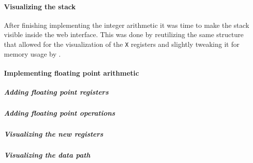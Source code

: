 \paragraph*{Visualizing the stack}

After finishing implementing the integer arithmetic it was time to make the stack visible inside the web interface. This was done by reutilizing the same structure that allowed for the visualization of the \verb|X| registers and slightly tweaking it for memory usage by .

\paragraph*{Implementing floating point arithmetic}
\subparagraph*{Adding floating point registers}
\subparagraph*{Adding floating point operations}
\subparagraph*{Visualizing the new registers}
\subparagraph*{Visualizing the data path}